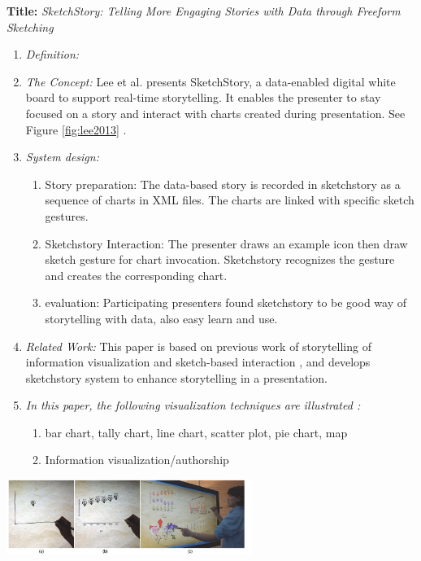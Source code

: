 \documentclass{egpubl}
\begin{document}
\textbf{Title:} \textit{SketchStory: Telling More Engaging Stories with Data through Freeform Sketching}
\begin{enumerate}
\item \textit{Definition:} 

\item \textit{The Concept:} Lee et al. presents SketchStory, a data-enabled digital white board to support real-time storytelling. It enables the presenter to stay focused on a story and interact with charts created during presentation. See Figure \ref{fig:lee2013} \cite{lee2013}.
\item \textit{System design:}
\begin{enumerate}
\item Story preparation: The data-based story is recorded in sketchstory as a sequence of charts in XML files. The charts are linked with specific sketch gestures.
\item Sketchstory Interaction: The presenter draws an example icon then draw sketch gesture for chart invocation. Sketchstory recognizes the gesture and creates the corresponding chart.
\item evaluation: Participating presenters found sketchstory to be good way of storytelling with data, also easy learn and use.
\end{enumerate}
\item \textit{Related Work:}  This paper is based on previous work of storytelling of information visualization \cite{Gershon2,segal} and sketch-based interaction \cite{li2012}, and develops sketchstory system to enhance storytelling in a presentation.
\item \textit{In this paper, the following visualization techniques are illustrated :} 
\begin{enumerate}
\item bar chart, tally chart, line chart, scatter plot, pie chart, map
\item Information visualization/authorship
\end{enumerate}
\end{enumerate}
\begingroup
\centering
\includegraphics[width=8cm]{./images/lee2013}
\label{fig:lee2013}
\endgroup
\end{document}
